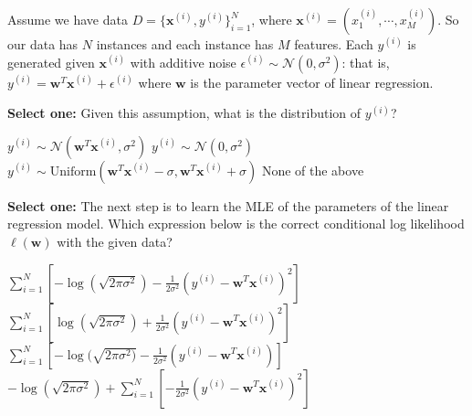 \documentclass[11pt,addpoints,answers]{exam}
\newcommand{\Nc}{\mathcal{N}}
\newcommand{\sone}{\textbf{Select one: }}
\begin{document}
\begin{questions}
\begin{parts}
    Assume we have data $D = \{\mathbf{x}^{(i)}, y^{(i)}\}_{i=1}^{N}$, where $\mathbf{x}^{(i)} = (x_1^{(i)}, \cdots, x_M^{(i)})$. So our data has $N$ instances and each instance has $M$ features. Each $y^{(i)}$ is generated given $\mathbf{x}^{(i)}$ with additive noise $\epsilon^{(i)} \sim \Nc(0, \sigma^2)$: that is, $y^{(i)} = \mathbf{w}^T \mathbf{x}^{(i)} + \epsilon^{(i)}$ where $\mathbf{w}$ is the parameter vector of linear regression.
    \begin{subparts}
    \subpart[2] \sone Given this assumption, what is the distribution of $y^{(i)}$? 
    \begin{checkboxes}
        \choice $y^{(i)} \sim \Nc(\mathbf{w}^T \mathbf{x}^{(i)}, \sigma^2)$
        \choice $y^{(i)} \sim \Nc(0, \sigma^2)$
        \choice $y^{(i)} \sim \text{Uniform}(\mathbf{w}^T \mathbf{x}^{(i)} - \sigma,  \mathbf{w}^T \mathbf{x}^{(i)} + \sigma)$
        \choice None of the above
    \end{checkboxes}
    
    
    \vspace{5mm}
    
    \subpart[2] \sone The next step is to learn the MLE of the parameters of the linear regression model. Which expression below is the correct conditional log likelihood $\ell(\mathbf{w})$ with the given data?
    \begin{checkboxes}
        \choice $\sum_{i=1}^{N} [-\log (\sqrt{2\pi\sigma^2}) - \frac{1}{2\sigma^2} (y^{(i)} - \mathbf{w}^T\mathbf{x}^{(i)})^2]$
        \choice $\sum_{i=1}^{N} [\log (\sqrt{2\pi\sigma^2}) + \frac{1}{2\sigma^2} (y^{(i)} - \mathbf{w}^T\mathbf{x}^{(i)})^2]$
        \choice $\sum_{i=1}^{N} [-\log(\sqrt{2\pi\sigma^2)} - \frac{1}{2\sigma^2} (y^{(i)} - \mathbf{w}^T\mathbf{x}^{(i)})]$
        \choice $-\log (\sqrt{2\pi\sigma^2}) + \sum_{i=1}^{N} [-\frac{1}{2\sigma^2} (y^{(i)} - \mathbf{w}^T\mathbf{x}^{(i)})^2]$
    \end{checkboxes}
    
    
    \vspace{5mm}
    

\end{subparts}
\end{parts}
\end{questions}
\end{document}
